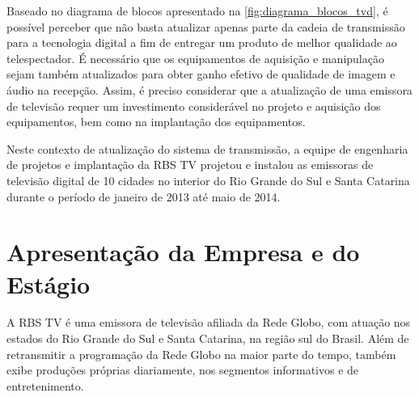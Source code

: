 \documentclass[
	12pt,				%
	oneside,			%
	a4paper,			%
	brazil
	]{abntex2}
\begin{document}
Baseado no diagrama de blocos apresentado na \autoref{fig:diagrama_blocos_tvd}, é possível perceber que não basta atualizar apenas parte da cadeia de transmissão para a tecnologia digital a fim de entregar um produto de melhor qualidade ao telespectador. É necessário que os equipamentos de aquisição e manipulação sejam também atualizados para obter ganho efetivo de qualidade de imagem e áudio na recepção. Assim, é preciso considerar que a atualização de uma emissora de televisão requer um investimento considerável no projeto e aquisição dos equipamentos, bem como na implantação dos equipamentos.

Neste contexto de atualização do sistema de transmissão, a equipe de engenharia de projetos e implantação da RBS TV projetou e instalou as emissoras de televisão digital de 10 cidades no interior do Rio Grande do Sul e Santa Catarina durante o período de janeiro de 2013 até maio de 2014.


%


\section{Apresentação da Empresa e do Estágio}

A RBS TV é uma emissora de televisão afiliada da Rede Globo, com atuação nos estados do Rio Grande do Sul e Santa Catarina, na região sul do Brasil. Além de retransmitir a programação da Rede Globo na maior parte do tempo, também exibe produções próprias diariamente, nos segmentos informativos e de entretenimento.
\end{document}
